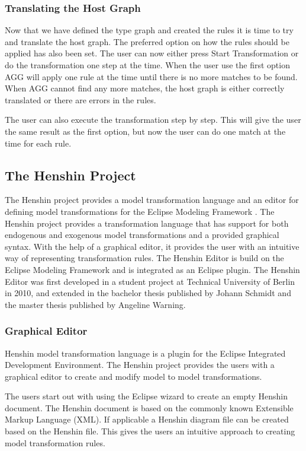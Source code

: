 \subsubsection*{Translating the Host Graph}

Now that we have defined the type graph and created the rules it is time to try
and translate the host graph. The preferred option on how the rules should be
applied has also been set. The user can now either press Start Transformation or
do the transformation one step at the time. When the user use the first option
AGG will apply one rule at the time until there is no more matches to be found.
When AGG cannot find any more matches, the host graph is either correctly
translated or there are errors in the rules. 

The user can also execute the transformation step by step. This will give the
user the same result as the first option, but now the user can do one match at
the time for each rule. 

\subsection{The Henshin Project}

The Henshin project\cite{Henshin} provides a model transformation
language and an editor for defining model transformations for the Eclipse
Modeling Framework \cite{Steinberg2009}. The Henshin project provides a
transformation language that has support for both endogenous and exogenous
model transformations and a provided graphical syntax. With the help of a
graphical editor, it provides the user with an intuitive way of representing
transformation rules. The Henshin Editor is build on the Eclipse Modeling
Framework and is integrated as an Eclipse plugin. The Henshin Editor was first
developed in a student project at Technical University of Berlin in 2010, and
extended in the bachelor thesis \cite{JohannSchmidt} published by Johann Schmidt
and the master thesis \cite{AngelineWarning} published by Angeline Warning.

\subsubsection*{Graphical Editor}
Henshin model transformation language is a plugin for the Eclipse
Integrated Development Environment\cite{Eclipse}. The Henshin project provides
the users with a graphical editor to create and modify model to model
transformations. 

The users start out with using the Eclipse wizard to create an empty Henshin
document. The Henshin document is based on the commonly known Extensible Markup
Language (XML)\cite{XML}. If applicable a Henshin diagram file can be created
based on the Henshin file. This gives the users an intuitive approach to
creating model transformation rules.

